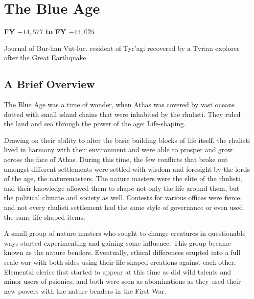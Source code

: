 \section{The Blue Age}
\textbf{FY $-14,577$ to FY $-14,025$}

{Journal of Bur-han Vut-luc, resident of Tyr'agi recovered by a Tyrian explorer after the Great Earthquake.}

\subsection{A Brief Overview}
The Blue Age was a time of wonder, when Athas was covered by vast oceans dotted with small island chains that were inhabited by the rhulisti. They ruled the land  and sea through the power of the age: Life-shaping.

Drawing on their ability to alter the basic building blocks of life itself, the rhulisti lived in harmony with their environment and were able to prosper and grow across the face of Athas. During this time, the few conflicts that broke out amongst different settlements were settled with wisdom and foresight by the lords of the age, the naturemasters. The nature masters were the elite of the rhulisti, and their knowledge allowed them to shape not only the life around them, but the political climate and society as well. Contests for various offices were fierce, and not every rhulisti settlement had the same style of governance or even used the same life-shaped items.

A small group of nature masters who sought to change creatures in questionable ways started experimenting and gaining  some influence. This group became known as the nature benders. Eventually, ethical differences erupted into a full scale war with both sides using their life-shaped creations against each other. Elemental clerics first started to appear at this time as did wild talents and minor users of psionics, and both were seen as abominations as they used their new powers with the nature benders in the First War.


